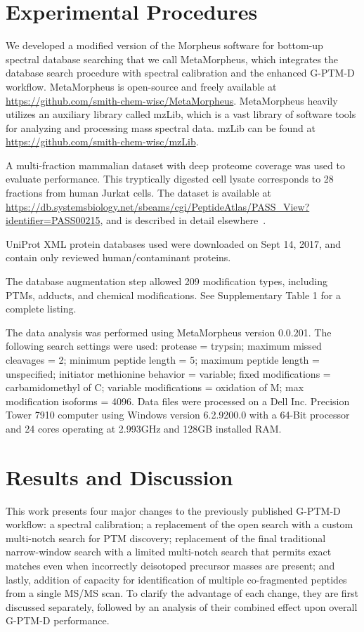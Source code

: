 \documentclass[journal=jprobs,manuscript=article]{achemso}
\begin{document}
\section{Experimental Procedures}

We developed a modified version of the Morpheus software for bottom-up spectral database searching\citep{Wenger_2013} that we call MetaMorpheus, which integrates the database search procedure with spectral calibration and the enhanced G-PTM-D workflow.
MetaMorpheus is open-source and freely available at \url{https://github.com/smith-chem-wisc/MetaMorpheus}.
MetaMorpheus heavily utilizes an auxiliary library called mzLib, which is a vast library of software tools for analyzing and processing mass spectral data.
mzLib can be found at \url{https://github.com/smith-chem-wisc/mzLib}.

A multi-fraction mammalian dataset with deep proteome coverage was used to evaluate performance.
This tryptically digested cell lysate corresponds to 28 fractions from human Jurkat cells.
The dataset is available at \url{https://db.systemsbiology.net/sbeams/cgi/PeptideAtlas/PASS_View?identifier=PASS00215}, and is described in detail elsewhere~\citep{Sheynkman2013, Shortreed_2015, Cesnik_2016}.

UniProt XML protein databases used were downloaded on Sept 14, 2017, and contain only reviewed human/contaminant proteins.

The database augmentation step allowed 209 modification types, including PTMs, adducts, and chemical modifications. See Supplementary Table 1 for a complete listing.

The data analysis was performed using MetaMorpheus version 0.0.201.
The following search settings were used: protease = trypsin; maximum missed cleavages = 2; minimum peptide length = 5; maximum peptide length = unspecified; initiator methionine behavior = variable; fixed modifications = carbamidomethyl of C; variable modifications = oxidation of M; max modification isoforms = 4096.
Data files were processed on a Dell Inc. Precision Tower 7910 computer using Windows version 6.2.9200.0 with a 64-Bit processor and 24 cores operating at 2.993GHz and 128GB installed RAM.

\section{Results and Discussion}

This work presents four major changes to the previously published G-PTM-D workflow:
a spectral calibration;
a replacement of the open search with a custom multi-notch search for PTM discovery;
replacement of the final traditional narrow-window search with a limited multi-notch search that permits exact matches even when incorrectly deisotoped precursor masses are present;
and lastly, addition of capacity for identification of multiple co-fragmented peptides from a single MS/MS scan.
To clarify the advantage of each change, they are first discussed separately, followed by an analysis of their combined effect upon overall G-PTM-D performance.
\end{document}

